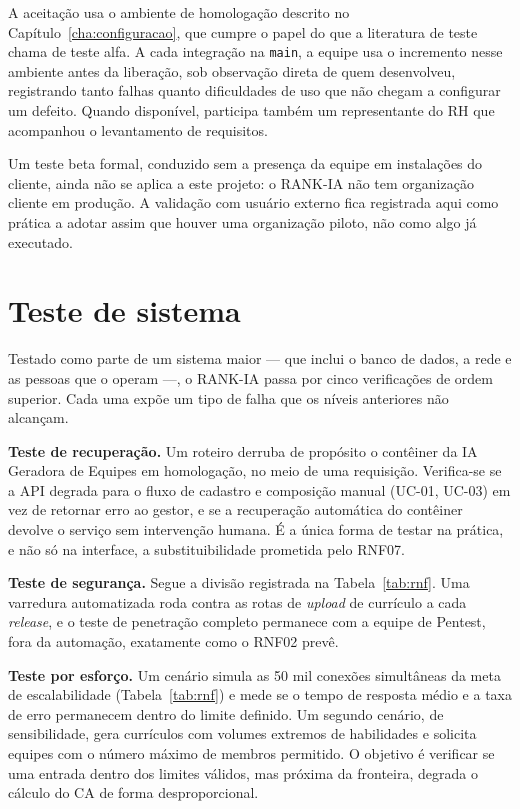 \documentclass[a4paper,12pt,oneside,openany]{book}
\newif\iforientacoes
\newcommand{\orientacao}[1]{%
    \iforientacoes
        \begin{quote}
        \small\itshape\textbf{Orientação:} #1
        \end{quote}
    \fi
}
\begin{document}
A aceitação usa o ambiente de homologação descrito no
Capítulo~\ref{cha:configuracao}, que cumpre o papel do que a literatura de
teste chama de teste alfa. A cada integração na \texttt{main}, a equipe usa o
incremento nesse ambiente antes da liberação, sob observação direta de quem
desenvolveu, registrando tanto falhas quanto dificuldades de uso que não chegam
a configurar um defeito. Quando disponível, participa também um representante
do RH que acompanhou o levantamento de requisitos.

Um teste beta formal, conduzido sem a presença da equipe em instalações do
cliente, ainda não se aplica a este projeto: o RANK-IA não tem organização
cliente em produção. A validação com usuário externo fica registrada aqui como
prática a adotar assim que houver uma organização piloto, não como algo já
executado.

\section{Teste de sistema}\label{sec:teste-sistema}

\orientacao{Descrevam como o software será testado já combinado aos demais
elementos do sistema (hardware, rede, pessoas, dados), cobrindo aspectos como
recuperação de falhas, segurança, desempenho sob carga e configuração.}

Testado como parte de um sistema maior --- que inclui o banco de dados, a rede
e as pessoas que o operam ---, o RANK-IA passa por cinco verificações de ordem
superior. Cada uma expõe um tipo de falha que os níveis anteriores não
alcançam.

\textbf{Teste de recuperação.} Um roteiro derruba de propósito o contêiner da
IA Geradora de Equipes em homologação, no meio de uma requisição. Verifica-se
se a API degrada para o fluxo de cadastro e composição manual (UC-01, UC-03) em
vez de retornar erro ao gestor, e se a recuperação automática do contêiner
devolve o serviço sem intervenção humana. É a única forma de testar na prática,
e não só na interface, a substituibilidade prometida pelo RNF07.

\textbf{Teste de segurança.} Segue a divisão registrada na
Tabela~\ref{tab:rnf}. Uma varredura automatizada roda contra as rotas de
\textit{upload} de currículo a cada \textit{release}, e o teste de penetração
completo permanece com a equipe de Pentest, fora da automação, exatamente como
o RNF02 prevê.

\textbf{Teste por esforço.} Um cenário simula as 50 mil conexões simultâneas da
meta de escalabilidade (Tabela~\ref{tab:rnf}) e mede se o tempo de resposta
médio e a taxa de erro permanecem dentro do limite definido. Um segundo
cenário, de sensibilidade, gera currículos com volumes extremos de habilidades
e solicita equipes com o número máximo de membros permitido. O objetivo é
verificar se uma entrada dentro dos limites válidos, mas próxima da fronteira,
degrada o cálculo do CA de forma desproporcional.
\end{document}

